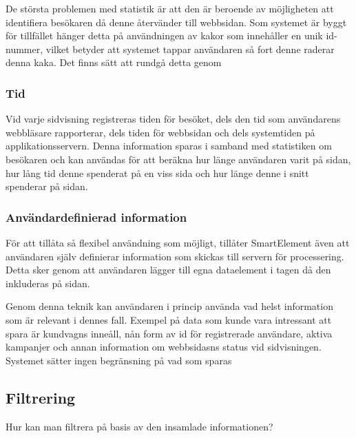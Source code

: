 De största problemen med statistik är att den är beroende av möjligheten att identifiera besökaren då denne återvänder till webbsidan. Som systemet är byggt för tillfället hänger detta på användningen av kakor som innehåller en unik id-nummer, vilket betyder att systemet tappar användaren så fort denne raderar denna kaka. Det finns sätt att rundgå detta genom 


\subsubsection{Tid}

Vid varje sidvisning registreras tiden för besöket, dels den tid som användarens webbläsare rapporterar, dels tiden för webbsidan och dels systemtiden på applikationsservern. Denna information sparas i samband med statistiken om besökaren och kan användas för att beräkna hur länge användaren varit på sidan, hur lång tid denne spenderat på en viss sida och hur länge denne i snitt spenderar på sidan.

\subsubsection{Användardefinierad information}

För att tillåta så flexibel användning som möjligt, tillåter SmartElement även att användaren själv definierar information som skickas till servern för processering. Detta sker genom att användaren lägger till egna dataelement i tagen då den inkluderas på sidan.

Genom denna teknik kan användaren i princip använda vad helst information som är relevant i dennes fall. Exempel på data som kunde vara intressant att spara är kundvagns inneåll, nån form av id för registrerade användare, aktiva kampanjer och annan information om webbsidasns status vid sidvisningen. Systemet sätter ingen begränsning på vad som sparas

\subsection{Filtrering}

Hur kan man filtrera på basis av den insamlade informationen?



